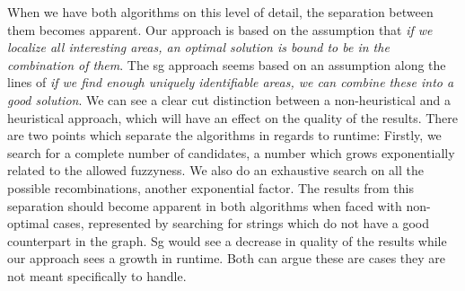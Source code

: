 \documentclass[thesis.tex]{subfiles}
\begin{document}
\par\noindent
When we have both algorithms on this level of detail, the separation between them becomes apparent. Our approach is based on the assumption that \textit{if we localize all interesting areas, an optimal solution is bound to be in the combination of them}. The sg approach seems based on an assumption along the lines of \textit{if we find enough uniquely identifiable areas, we can combine these into a good solution}. We can see a clear cut distinction between a non-heuristical and a heuristical approach, which will have an effect on the quality of the results. There are two points which separate the algorithms in regards to runtime: Firstly, we search for a complete number of candidates, a number which grows exponentially related to the allowed fuzzyness. We also do an exhaustive search on all the possible recombinations, another exponential factor. The results from this separation should become apparent in both algorithms when faced with non-optimal cases, represented by searching for strings which do not have a good counterpart in the graph. Sg would see a decrease in quality of the results while our approach sees a growth in runtime. Both can argue these are cases they are not meant specifically to handle. 
\end{document}
